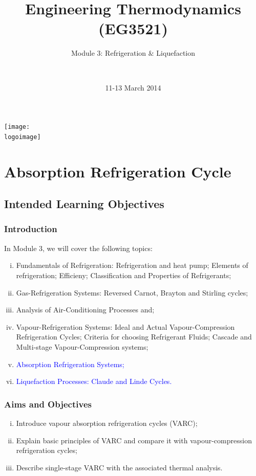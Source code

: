 \documentclass[10pt,compress]{beamer}
\institute{School of Engineering}
\title{Engineering Thermodynamics (EG3521)}
\subtitle{Module 3: Refrigeration $\&$ Liquefaction}
\date[11-13/03/2014]{11-13 March 2014}
\author[\shortname]{%
  \fullname\\\ttfamily{\emailaddress}
}
\newcommand{\logoimage}{../FigBanner/UoAHorizBanner}
\begin{document}
\begin{frame}
  \titlepage
  \vfill%
  \begin{center}
    \texttt{[image: \\logoimage]}
  \end{center}
\end{frame}




\section{Absorption Refrigeration Cycle}

\subsection{Intended Learning Objectives}
\begin{frame}
 \frametitle{Introduction}
  In Module 3, we will cover the following topics:
  \begin{enumerate}[(i)]
   \item <1-> Fundamentals of Refrigeration: Refrigeration and heat pump; Elements of refrigeration; Efficieny; Classification and Properties of Refrigerants;
   \item <1-> Gas-Refrigeration Systems: Reversed Carnot, Brayton and Stirling cycles;
   \item <1-> Analysis of Air-Conditioning Processes and;
   \item <1-> Vapour-Refrigeration Systems: Ideal and Actual Vapour-Compression Refrigeration Cycles; Criteria for choosing Refrigerant Fluids; Cascade and Multi-stage Vapour-Compression systems;
   \item <2-> \textcolor{blue}{Absorption Refrigeration Systems;}
   \item <3-> \textcolor{blue}{Liquefaction Processes: Claude and Linde Cycles.}
  \end{enumerate}
\end{frame}

\begin{frame}
 \frametitle{Aims and Objectives}
  \begin{enumerate}[(i)]
   \item <1-> Introduce vapour absorption refrigeration cycles (VARC);
   \item <2-> Explain basic principles of VARC and compare it with vapour-compression refrigeration cycles;
   \item <3-> Describe single-stage VARC with the associated thermal analysis.
  \end{enumerate}
\end{frame}
\end{document}
